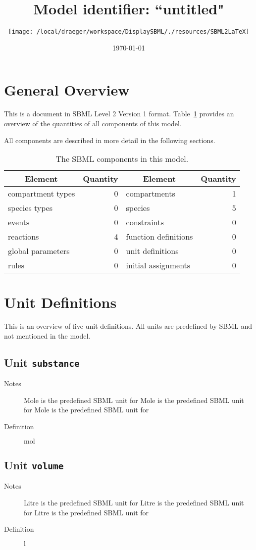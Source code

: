 \documentclass[11pt,twoside,a4paper]{scrartcl}
\title{Model identifier: ``untitled"}
\date{\today}
\author{\texttt{[image: /local/draeger/workspace/DisplaySBML/./resources/SBML2LaTeX]}}
\begin{document}
\maketitle
\thispagestyle{scrheadings}


\section{General Overview}
This is a document in SBML Level 2 Version 1 format. Table~\ref{tab:components} provides an overview of the quantities of all components of this model.
\begin{table}[h!]
\centering
\caption{The SBML components in this model.}\label{tab:components}
All components are described in more detail in the following sections.
\begin{tabular}{l|r||l|r}
\toprule
\multicolumn{1}{c}{Element}&\multicolumn{1}{|c||}{Quantity}&\multicolumn{1}{c|}{Element}&\multicolumn{1}{c}{Quantity}\\

\midrule
compartment types&0&compartments&1\\
species types&0&species&5\\
events&0&constraints&0\\
reactions&4&function definitions&0\\
global parameters&0&unit definitions&0\\
rules&0&initial assignments&0\\
\bottomrule\end{tabular}
\end{table}

\section{Unit Definitions}
This is an overview of five unit definitions.
All units are predefined by SBML and not mentioned in the model.
\subsection{Unit \texttt{substance}}
\begin{description}
\item[Notes] Mole is the predefined SBML unit for Mole is the predefined SBML unit for Mole is the predefined SBML unit for 
\item[Definition] $\mathrm{mol}$
\end{description}

\subsection{Unit \texttt{volume}}
\begin{description}
\item[Notes] Litre is the predefined SBML unit for Litre is the predefined SBML unit for Litre is the predefined SBML unit for 
\item[Definition] $\mathrm{l}$
\end{description}
\end{document}

